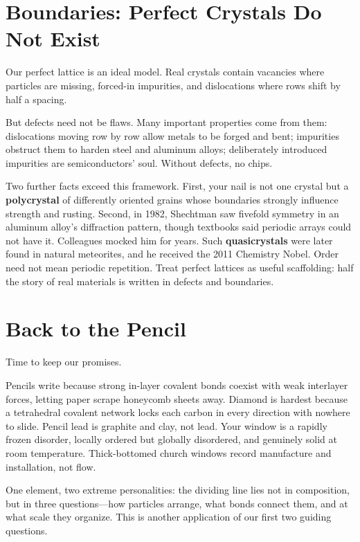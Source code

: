 \section{Boundaries: Perfect Crystals Do Not Exist}

Our perfect lattice is an ideal model. Real crystals contain vacancies where particles are missing, forced-in impurities, and dislocations where rows shift by half a spacing.

But defects need not be flaws. Many important properties come from them: dislocations moving row by row allow metals to be forged and bent; impurities obstruct them to harden steel and aluminum alloys; deliberately introduced impurities are semiconductors' soul. Without defects, no chips.

Two further facts exceed this framework. First, your nail is not one crystal but a \textbf{polycrystal} of differently oriented grains whose boundaries strongly influence strength and rusting. Second, in 1982, Shechtman saw fivefold symmetry in an aluminum alloy's diffraction pattern, though textbooks said periodic arrays could not have it. Colleagues mocked him for years. Such \textbf{quasicrystals} were later found in natural meteorites, and he received the 2011 Chemistry Nobel. Order need not mean periodic repetition. Treat perfect lattices as useful scaffolding: half the story of real materials is written in defects and boundaries.

\section{Back to the Pencil}

Time to keep our promises.

Pencils write because strong in-layer covalent bonds coexist with weak interlayer forces, letting paper scrape honeycomb sheets away. Diamond is hardest because a tetrahedral covalent network locks each carbon in every direction with nowhere to slide. Pencil lead is graphite and clay, not lead. Your window is a rapidly frozen  disorder, locally ordered but globally disordered, and genuinely solid at room temperature. Thick-bottomed church windows record manufacture and installation, not flow.

One element, two extreme personalities: the dividing line lies not in composition, but in three questions---how particles arrange, what bonds connect them, and at what scale they organize. This is another application of our first two guiding questions.

